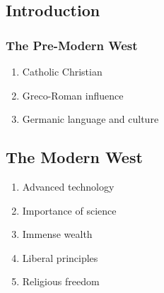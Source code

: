 \documentclass{article}
\begin{document}
\begin{spacing}{1.2}
    \newpage
    \section{Introduction}
    \subsubsection*{The Pre-Modern West}
    \begin{enumerate}
        \item Catholic Christian
        \item Greco-Roman influence
        \item Germanic language and culture
    \end{enumerate}
    \subsection*{The Modern West}
    \begin{enumerate}
        \item Advanced technology
        \item Importance of science
        \item Immense wealth
        \item Liberal principles
        \item Religious freedom
    \end{enumerate}

\end{spacing}
\end{document}
